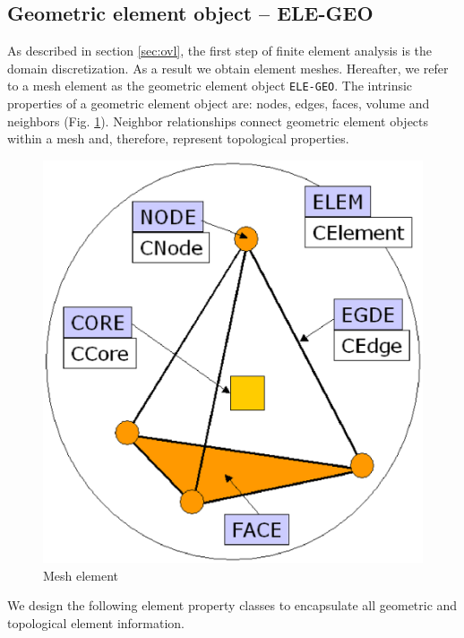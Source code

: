 \subsection{Geometric element object -- ELE-GEO}
\label{sec:ele_geo}

As described in section \ref{sec:ovl}, the first step of finite
element analysis is the domain discretization. As a result we
obtain element meshes. Hereafter, we refer to a mesh element as
the geometric element object \texttt{ELE-GEO}. The intrinsic
properties of a geometric element object are: nodes, edges, faces, volume and neighbors (Fig. \ref{fig:elem}). Neighbor relationships connect
geometric element objects within a mesh and, therefore, represent
topological properties.

\begin{figure}[H]
\centering
\includegraphics[scale=0.4]{figures/elem.eps}
\caption{Mesh element}
\label{fig:elem}
\end{figure}


We design the following element property classes to encapsulate
all geometric and topological element information.

